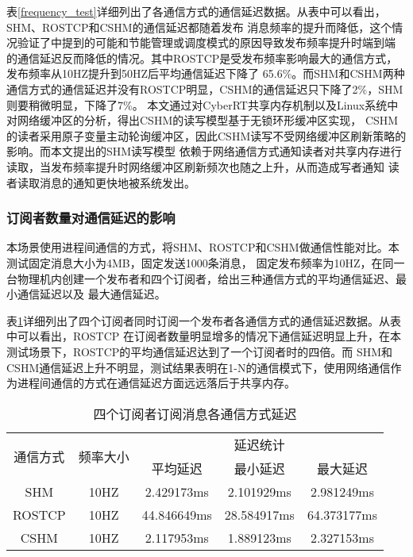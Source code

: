 表\ref{frequency_test}详细列出了各通信方式的通信延迟数据。从表中可以看出，SHM、ROSTCP和CSHM的通信延迟都随着发布
消息频率的提升而降低，这个情况验证了\cite{9591166}中提到的可能和节能管理或调度模式的原因导致发布频率提升时端到端
的通信延迟反而降低的情况。其中ROSTCP是受发布频率影响最大的通信方式，发布频率从10HZ提升到50HZ后平均通信延迟下降了
65.6\%。而SHM和CSHM两种通信方式的通信延迟并没有ROSTCP明显，CSHM的通信延迟只下降了2\%，SHM则要稍微明显，下降了7\%。
本文通过对CyberRT共享内存机制以及Linux系统中对网络缓冲区的分析，得出CSHM的读写模型基于无锁环形缓冲区实现，
CSHM的读者采用原子变量主动轮询缓冲区，因此CSHM读写不受网络缓冲区刷新策略的影响。而本文提出的SHM读写模型
依赖于网络通信方式通知读者对共享内存进行读取，当发布频率提升时网络缓冲区刷新频次也随之上升，从而造成写者通知
读者读取消息的通知更快地被系统发出。

\subsubsection{订阅者数量对通信延迟的影响}
本场景使用进程间通信的方式，将SHM、ROSTCP和CSHM做通信性能对比。本测试固定消息大小为4MB，固定发送1000条消息，
固定发布频率为10HZ，在同一台物理机内创建一个发布者和四个订阅者，给出三种通信方式的平均通信延迟、最小通信延迟以及
最大通信延迟。

表\ref{multi_subscribers}详细列出了四个订阅者同时订阅一个发布者各通信方式的通信延迟数据。从表中可以看出，ROSTCP
在订阅者数量明显增多的情况下通信延迟明显上升，在本测试场景下，ROSTCP的平均通信延迟达到了一个订阅者时的四倍。而
SHM和CSHM通信延迟上升不明显，测试结果表明在1-N的通信模式下，使用网络通信作为进程间通信的方式在通信延迟方面远远落后于共享内存。
\begin{table}[htb]
  \centering\small
  \caption{四个订阅者订阅消息各通信方式延迟}
  \renewcommand\arraystretch{1.2}
  \label{multi_subscribers}
  \begin{tabular}{ccccc}
    \toprule
    \multirow{2}{*}{通信方式} & \multirow{2}{*}{频率大小} & \multicolumn{3}{c}{延迟统计}\\
     & & 平均延迟 & 最小延迟 & 最大延迟\\
    \midrule
    SHM & 10HZ& 2.429173ms& 2.101929ms& 2.981249ms\\ 
    \hline
    ROSTCP & 10HZ& 44.846649ms& 28.584917ms& 64.373177ms\\ 
    \hline
    CSHM & 10HZ& 2.117953ms& 1.889123ms& 2.327153ms\\ 
    \bottomrule
  \end{tabular}
\end{table}

